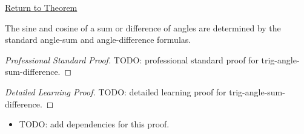 \newpage
{}
\label{prf:trig-angle-sum-difference}

\begin{remark*}[Return]
\hyperref[thm:trig-angle-sum-difference]{Return to Theorem}
\end{remark*}

\begin{theorem*}
The sine and cosine of a sum or difference of angles are determined by the
standard angle-sum and angle-difference formulas.
\end{theorem*}

\begin{proof}[Professional Standard Proof]
\LRAProofBodyStart
TODO: professional standard proof for trig-angle-sum-difference.
\end{proof}

\begin{proof}[Detailed Learning Proof]
\LRAProofBodyStart
TODO: detailed learning proof for trig-angle-sum-difference.
\end{proof}

\begin{remark*}
\end{remark*}

\begin{dependencies}
\begin{itemize}
  \item TODO: add dependencies for this proof.
\end{itemize}
\end{dependencies}

\clearpage
